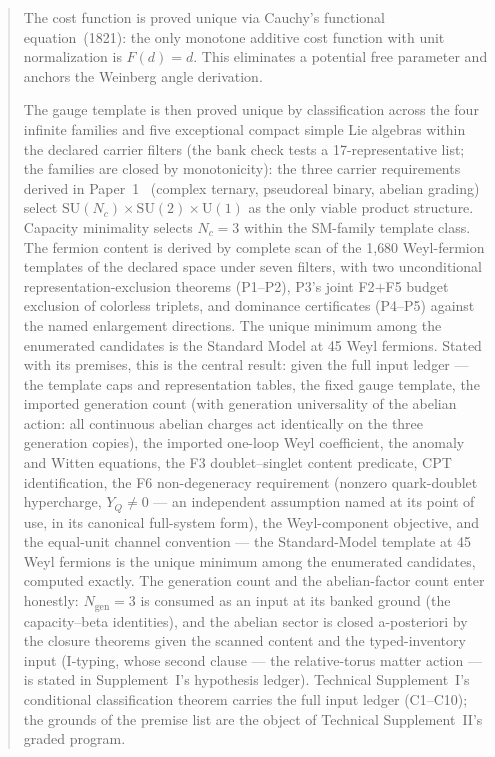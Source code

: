 \documentclass[11pt]{article}
\newcommand{\SU}{\mathrm{SU}}
\newcommand{\U}{\mathrm{U}}
\begin{document}
\begin{abstract}
The cost function is proved unique via Cauchy's functional equation~(1821): the only monotone additive cost function with unit normalization is $F(d) = d$.  This eliminates a potential free parameter and anchors the Weinberg angle derivation.

The gauge template is then proved unique by classification across the four infinite families and five exceptional compact simple Lie algebras within the declared carrier filters (the bank check tests a 17-representative list; the families are closed by monotonicity): the three carrier requirements derived in Paper~1~\cite{BrookePaper1} (complex ternary, pseudoreal binary, abelian grading) select $\SU(N_c) \times \SU(2) \times \U(1)$ as the only viable product structure.  Capacity minimality selects $N_c = 3$ within the SM-family template class.  The fermion content is derived by complete scan of the 1{,}680 Weyl-fermion templates of the declared space under seven filters, with two unconditional representation-exclusion theorems (P1--P2), P3's joint F2$+$F5 budget exclusion of colorless triplets, and dominance certificates (P4--P5) against the named enlargement directions.  The unique minimum among the enumerated candidates is the Standard Model at 45 Weyl fermions.  Stated with its premises, this is the central result: given the full input ledger --- the template caps and representation tables, the fixed gauge template, the imported generation count (with generation universality of the abelian action: all continuous abelian charges act identically on the three generation copies), the imported one-loop Weyl coefficient, the anomaly and Witten equations, the F3 doublet--singlet content predicate, CPT identification, the F6 non-degeneracy requirement (nonzero quark-doublet hypercharge, $Y_Q \neq 0$ --- an independent assumption named at its point of use, in its canonical full-system form), the Weyl-component objective, and the equal-unit channel convention --- the Standard-Model template at 45 Weyl fermions is the unique minimum among the enumerated candidates, computed exactly.  The generation count and the abelian-factor count enter honestly: $N_{\mathrm{gen}} = 3$ is consumed as an input at its banked ground (the capacity--beta identities), and the abelian sector is closed a-posteriori by the closure theorems given the scanned content and the typed-inventory input (I-typing, whose second clause --- the relative-torus matter action --- is stated in Supplement~I's hypothesis ledger).  Technical Supplement~I's conditional classification theorem carries the full input ledger (C1--C10); the grounds of the premise list are the object of Technical Supplement~II's graded program.


\end{abstract}
\end{document}
